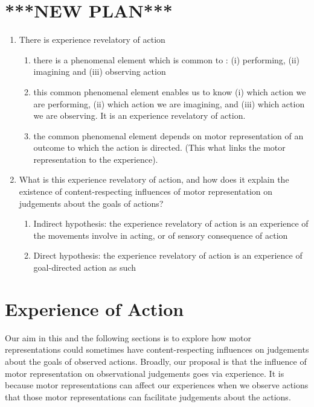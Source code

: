 \documentclass[12pt,\papersize]{extarticle}
\begin{document}
\section{***NEW PLAN***}
\begin{enumerate}
\item There is experience revelatory of action
	\begin{enumerate}
	\item there is a phenomenal element which is common to : (i) performing, (ii) imagining and (iii) observing action
	\item this common phenomenal element enables us to know (i) which action we are performing, (ii) which action we are imagining, and (iii) which action we are observing.  It is an experience revelatory of action.
	\item the common phenomenal element depends on motor representation of an outcome to which the action is directed.  (This what links the motor representation to the experience).
	\end{enumerate}

\item What is this experience revelatory of action, and how does it explain the existence of content-respecting influences of motor representation on judgements about the goals of actions?
	\begin{enumerate}
	\item Indirect hypothesis: the experience revelatory of action is an experience of the movements involve in acting, or of sensory consequence of action

	\item Direct hypothesis: the experience revelatory of action is an experience of goal-directed action as such
	\end{enumerate}


\end{enumerate}


\section{Experience of Action}
\label{sec:processes}
Our aim in this and the following sections is to explore how motor representations could sometimes have content-respecting influences on judgements about the goals of observed actions. Broadly, our proposal is that the influence of motor representation on observational judgements goes via experience.  It is because motor representations can affect our experiences when we observe actions that those motor representations can facilitate judgements about the actions. 
\end{document}
